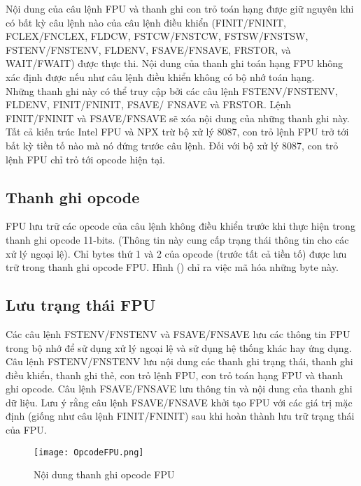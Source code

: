 	Nội dung của câu lệnh FPU và thanh ghi con trỏ toán hạng được giữ nguyên khi có bất kỳ câu lệnh nào của câu lệnh điều khiển (FINIT/FNINIT, FCLEX/FNCLEX, FLDCW, FSTCW/FNSTCW, FSTSW/FNSTSW, FSTENV/FNSTENV, FLDENV, FSAVE/FNSAVE, FRSTOR, và WAIT/FWAIT) được thực thi. Nội dung của thanh ghi toán hạng FPU không xác định được nếu như câu lệnh điều khiển không có bộ nhớ toán hạng.\\
 	
	Những thanh ghi này có thể truy cập bởi các câu lệnh FSTENV/FNSTENV, FLDENV, FINIT/FNINIT, FSAVE/ FNSAVE và FRSTOR. Lệnh FINIT/FNINIT và FSAVE/FNSAVE sẽ xóa nội dung của những thanh ghi này.\\
	
	Tất cả kiến trúc Intel FPU và NPX trừ bộ xử lý 8087, con trỏ lệnh FPU trở tới bất kỳ tiền tố nào mà nó đứng trước câu lệnh. Đối với bộ xử lý 8087, con trỏ lệnh FPU chỉ trỏ tới opcode hiện tại.
	
 		\subsection*{Thanh ghi opcode}
	FPU lưu trữ các opcode của câu lệnh không điều khiển trước khi thực hiện trong thanh ghi opcode 11-bits. (Thông tin này cung cấp trạng thái thông tin cho các xử lý ngoại lệ). Chỉ bytes thứ 1 và 2 của opcode (trước tất cả tiền tố) được lưu trữ trong thanh ghi opcode FPU. Hình () chỉ ra việc mã hóa những byte này.
	
		\subsection*{ Lưu trạng thái FPU}
	Các câu lệnh FSTENV/FNSTENV và FSAVE/FNSAVE lưu các thông tin FPU trong bộ nhớ để sử dụng xử lý ngoại lệ và sử dụng hệ thống khác hay ứng dụng. Câu lệnh FSTENV/FNSTENV lưu nội dung các thanh ghi trạng thái, thanh ghi điều khiển, thanh ghi thẻ, con trỏ lệnh FPU, con trỏ toán hạng FPU và thanh ghi opcode. Câu lệnh FSAVE/FNSAVE lưu thông tin và nội dung của thanh ghi dữ liệu. Lưu ý rằng câu lệnh FSAVE/FNSAVE khởi tạo FPU với các giá trị mặc định (giống như câu lệnh FINIT/FNINIT) sau khi hoàn thành lưu trữ trạng thái của FPU.
	\begin{center}
			\begin{figure}[htp]
				\begin{center}
					\texttt{[image: OpcodeFPU.png]}
				\end{center}
				\caption{Nội dung thanh ghi opcode FPU}				
				\label{fig:OpFPU}				
			\end{figure}
		\end{center}	

